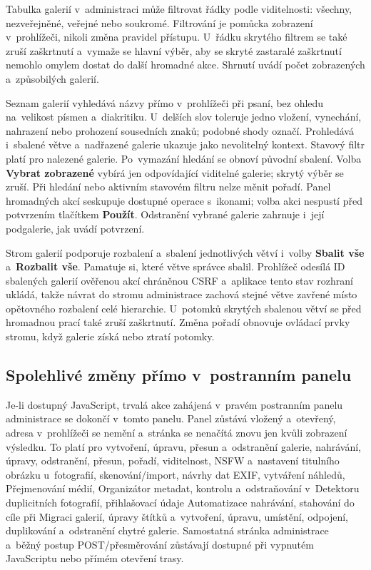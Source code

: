 \documentclass[11pt,a4paper]{article}
\newcommand{\ui}[1]{\textbf{#1}}
\begin{document}
Tabulka galerií v~administraci může filtrovat řádky podle viditelnosti: všechny,
nezveřejněné, veřejné nebo soukromé. Filtrování je pomůcka zobrazení
v~prohlížeči, nikoli změna pravidel přístupu. U~řádku skrytého filtrem se také
zruší zaškrtnutí a~vymaže se hlavní výběr, aby se skryté zastaralé zaškrtnutí
nemohlo omylem dostat do další hromadné akce. Shrnutí uvádí počet zobrazených
a~způsobilých galerií.

Seznam galerií vyhledává názvy přímo v~prohlížeči při psaní, bez ohledu
na~velikost písmen a~diakritiku. U~delších slov toleruje jedno vložení,
vynechání, nahrazení nebo prohození sousedních znaků; podobné shody označí.
Prohledává i~sbalené větve a~nadřazené galerie ukazuje jako nevolitelný kontext.
Stavový filtr platí pro nalezené galerie. Po~vymazání hledání se obnoví původní
sbalení. Volba \ui{Vybrat zobrazené} vybírá jen odpovídající viditelné galerie;
skrytý výběr se zruší. Při hledání nebo aktivním stavovém filtru nelze měnit
pořadí. Panel hromadných akcí seskupuje dostupné operace s~ikonami; volba akci
nespustí před potvrzením tlačítkem \ui{Použít}. Odstranění vybrané galerie
zahrnuje i~její podgalerie, jak uvádí potvrzení.

Strom galerií podporuje rozbalení a~sbalení jednotlivých větví i~volby
\ui{Sbalit vše} a~\ui{Rozbalit vše}. Pamatuje si, které větve správce sbalil.
Prohlížeč odesílá ID sbalených galerií ověřenou akcí chráněnou CSRF a~aplikace
tento stav rozhraní ukládá, takže návrat do stromu administrace zachová stejné
větve zavřené místo opětovného rozbalení celé hierarchie. U~potomků skrytých
sbalenou větví se před hromadnou prací také zruší zaškrtnutí. Změna pořadí
obnovuje ovládací prvky stromu, když galerie získá nebo ztratí potomky.

\subsection{Spolehlivé změny přímo v~postranním panelu}

Je-li dostupný JavaScript, trvalá akce zahájená v~pravém postranním panelu
administrace se dokončí v~tomto panelu. Panel zůstává vložený a~otevřený, adresa
v~prohlížeči se nemění a~stránka se nenačítá znovu jen kvůli zobrazení výsledku.
To platí pro vytvoření, úpravu, přesun a~odstranění galerie, nahrávání, úpravy,
odstranění, přesun, pořadí, viditelnost, NSFW a~nastavení titulního obrázku
u~fotografií, skenování/import, návrhy dat EXIF, vytváření náhledů, Přejmenování
médií, Organizátor metadat, kontrolu a~odstraňování v~Detektoru duplicitních
fotografií, přihlašovací údaje Automatizace nahrávání, stahování do cíle při
Migraci galerií, úpravy štítků a~vytvoření, úpravu, umístění, odpojení,
duplikování a~odstranění chytré galerie. Samostatná stránka administrace a~běžný
postup POST/přesměrování zůstávají dostupné při vypnutém JavaScriptu nebo přímém
otevření trasy.
\end{document}
